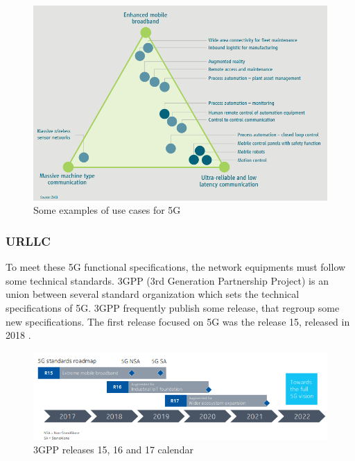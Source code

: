\documentclass[a4paper,10pt]{article}
\begin{document}
  \begin{figure}[h] 
      \begin{center}
      \includegraphics[width=1\textwidth]{usecases.png}
      \end{center}
      \caption{Some examples of use cases for 5G}\label{fig:usecases}
      \end{figure}
          
\subsubsection{URLLC}


To meet these 5G functional specifications, the network equipments must follow some technical standards. 3GPP (3rd Generation Partnership Project) is an union between several standard organization which sets the technical specifications of 5G. 3GPP frequently publish some release, that regroup some new specifications. The first release focused on 5G was the release 15, released in 2018 \cite{RELEASENOKIA}.  

  \begin{figure}[h]
      \begin{center}
      \includegraphics[width=1\textwidth]{release.png}
      \end{center}
      \caption{3GPP releases 15, 16 and 17 calendar}\label{fig:release}
      \end{figure}
  
\end{document}
